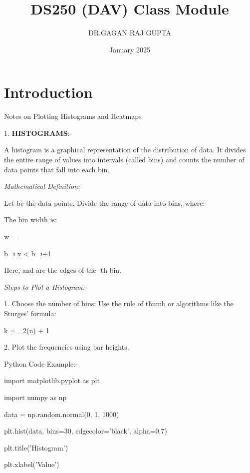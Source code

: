 \documentclass{report}
\title{DS250 (DAV) Class Module}
\author{DR.GAGAN RAJ GUPTA}
\date{January 2025}
\begin{document}
\maketitle

\section{Introduction}

 Notes on Plotting Histograms and Heatmaps 
 \setlength{\parskip}{1em}

 

1. \textbf{HISTOGRAMS}:-


\setlength{\parskip}{1em}


 
A histogram is a graphical representation of the distribution of data. It divides the entire range of values into intervals (called bins) and counts the number of data points that fall into each bin.


\textit\setlength{\parindent}{} 
\textit{{Mathematical Definition}:-} 


Let  be the data points. Divide the range of data into  bins, where:

The bin width  is:

w = 

b_i \leq x < b_{i+1} 

Here,  and  are the edges of the -th bin.


\textit{Steps to Plot a Histogram:-}


1. Choose the number of bins: Use the rule of thumb or algorithms like the Sturges' formula:



k = \lceil \log_2(n) + 1 \rceil

2. Plot the frequencies using bar heights.


\setlength{\parskip}{1em}


Python Code Example:-


import matplotlib.pyplot as plt

import numpy as np



data = np.random.normal(0, 1, 1000)


plt.hist(data, bins=30, edgecolor='black', alpha=0.7)

plt.title('Histogram')

plt.xlabel('Value')
\end{document}
